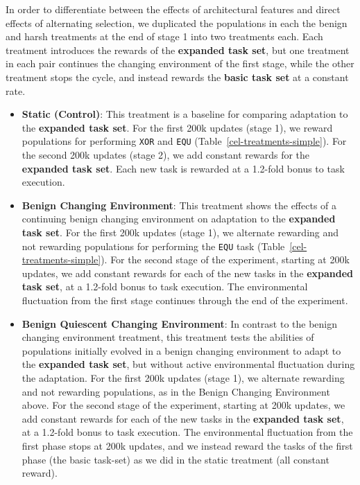 \documentclass[10pt,letterpaper]{article}
\begin{document}
In order to differentiate between the effects of architectural features and direct effects of alternating selection, we duplicated the populations in each the benign and harsh treatments at the end of stage 1 into two treatments each. Each treatment introduces the rewards of the \textbf{expanded task set}, but one treatment in each pair continues the changing environment of the first stage, while the other treatment stops the cycle, and instead rewards the \textbf{basic task set} at a constant rate.

\begin{itemize}
	\item \textbf{Static (Control)}: This treatment is a baseline for comparing adaptation to the \textbf{expanded task set}. For the first 200k updates (stage 1), we reward populations for performing  \texttt{XOR} and \texttt{EQU} (Table~\ref{cel-treatments-simple}). For the second 200k updates (stage 2), we add constant rewards for the \textbf{expanded task set}. Each new task is rewarded at a 1.2-fold bonus to task execution.

	\item \textbf{Benign Changing Environment}: This treatment shows the effects of a continuing benign changing environment on adaptation to the \textbf{expanded task set}. For the first 200k updates (stage 1), we alternate rewarding and not rewarding populations for performing the \texttt{EQU} task (Table~\ref{cel-treatments-simple}). For the second stage of the experiment, starting at 200k updates, we add constant rewards for each of the new tasks in the \textbf{expanded task set}, at a 1.2-fold bonus to task execution. The environmental fluctuation from the first stage continues through the end of the experiment.

	\item \textbf{Benign Quiescent Changing Environment}: In contrast to the benign changing environment treatment, this treatment tests the abilities of populations initially evolved in a benign changing environment to adapt to the \textbf{expanded task set}, but without active environmental fluctuation during the adaptation. For the first 200k updates (stage 1), we alternate rewarding and not rewarding populations, as in the Benign Changing Environment above. For the second stage of the experiment, starting at 200k updates, we add constant rewards for each of the new tasks in the \textbf{expanded task set}, at a 1.2-fold bonus to task execution. The environmental fluctuation from the first phase stops at 200k updates, and we instead reward the tasks of the first phase (the basic task-set) as we did in the static treatment (all constant reward).


\end{itemize}
\end{document}
